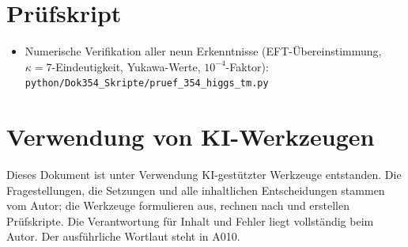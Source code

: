 \section{Prüfskript}

\begin{itemize}[leftmargin=2em,itemsep=2pt,topsep=2pt]
  \item Numerische Verifikation aller neun Erkenntnisse (EFT-Übereinstimmung,
    $\kappa=7$-Eindeutigkeit, Yukawa-Werte, $10^{-4}$-Faktor):
    \texttt{python/Dok354\_Skripte/pruef\_354\_higgs\_tm.py}
\end{itemize}

\section{Verwendung von KI-Werkzeugen}

Dieses Dokument ist unter Verwendung KI-gestützter Werkzeuge entstanden.
Die Fragestellungen, die Setzungen und alle inhaltlichen Entscheidungen
stammen vom Autor; die Werkzeuge formulieren aus, rechnen nach und erstellen
Prüfskripte. Die Verantwortung für Inhalt und Fehler liegt vollständig beim
Autor. Der ausführliche Wortlaut steht in A010.
